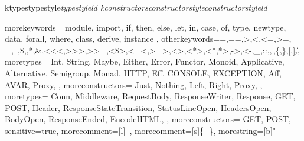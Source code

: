 \makeatletter
\lst@InstallKeywords k{types}{typestyle}\slshape{typestyle}{}ld
\lst@InstallKeywords k{constructors}{constructorstyle}\slshape{constructorstyle}{}ld
\makeatother

{
  morekeywords={
    module,
    import,
    if,
    then,
    else,
    let,
    in,
    case,
    of,
    type,
    newtype,
    data,
    forall,
    where,
    class,
    derive,
    instance
  },
  otherkeywords={=,==,>,<,<=,>=,\\=,~,\$,\@,*,\&,<<<,>>>,>>=,<\$>,<=<,>=>,<>,<*>,<*,*>,->,<-,_,::,\(,\),\{,\},[,],\|},
  moretypes={
    Int,
    String,
    Maybe,
    Either,
    Error,
    Functor,
    Monoid,
    Applicative,
    Alternative,
    Semigroup,
    Monad,
    HTTP,
    Eff,
    CONSOLE,
    EXCEPTION,
    Aff,
    AVAR,
    Proxy,
  },
  moreconstructors={
    Just,
    Nothing,
    Left,
    Right,
    Proxy,
  },
  moretypes={
    Conn,
    Middleware,
    RequestBody,
    ResponseWriter,
    Response,
    GET,
    POST,
    Header,
    ResponseStateTransition,
    StatusLineOpen,
    HeadersOpen,
    BodyOpen,
    ResponseEnded,
    EncodeHTML,
  },
  moreconstructors={
    GET,
    POST,
  }
  sensitive=true,
  morecomment=[l]{--}, %
  morecomment=[s]{\{-}{-\}}, %
  morestring=[b]" %
}

